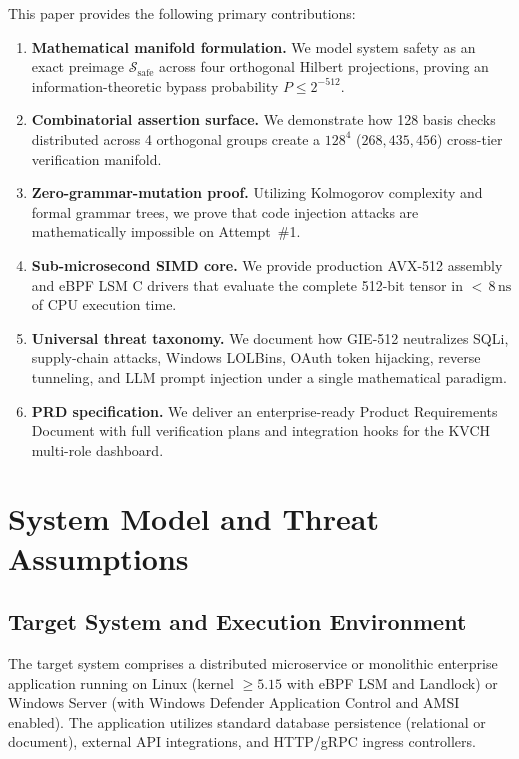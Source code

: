 \documentclass{portalciencia}
\theoremstyle{plain}
\theoremstyle{definition}
\begin{document}
This paper provides the following primary contributions:
\begin{enumerate}
  \item \textbf{Mathematical manifold formulation.} We model system safety as an exact preimage $\mathcal{S}_{\mathrm{safe}}$ across four orthogonal Hilbert projections, proving an information-theoretic bypass probability $P \le 2^{-512}$.
  \item \textbf{Combinatorial assertion surface.} We demonstrate how 128 basis checks distributed across 4 orthogonal groups create a $128^{4}$ ($268{,}435{,}456$) cross-tier verification manifold.
  \item \textbf{Zero-grammar-mutation proof.} Utilizing Kolmogorov complexity and formal grammar trees, we prove that code injection attacks are mathematically impossible on Attempt~\#1.
  \item \textbf{Sub-microsecond SIMD core.} We provide production AVX-512 assembly and eBPF LSM C drivers that evaluate the complete 512-bit tensor in ${<}\,8\,\mathrm{ns}$ of CPU execution time.
  \item \textbf{Universal threat taxonomy.} We document how GIE-512 neutralizes SQLi, supply-chain attacks, Windows LOLBins, OAuth token hijacking, reverse tunneling, and LLM prompt injection under a single mathematical paradigm.
  \item \textbf{PRD specification.} We deliver an enterprise-ready Product Requirements Document with full verification plans and integration hooks for the KVCH multi-role dashboard.
\end{enumerate}

\section{System Model and Threat Assumptions}

\subsection{Target System and Execution Environment}

The target system comprises a distributed microservice or monolithic enterprise application running on Linux (kernel $\ge 5.15$ with eBPF LSM and Landlock) or Windows Server (with Windows Defender Application Control and AMSI enabled). The application utilizes standard database persistence (relational or document), external API integrations, and HTTP/gRPC ingress controllers.
\end{document}
